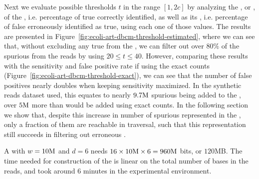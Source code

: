 Next we evaluate possible thresholds $t$ in the range $[1, 2c]$ by analyzing the , or , of the \dBCM, i.e. percentage of true  correctly identified, as well as its , i.e. percentage of false  erroneously identified as true, using each one of those values. The results are presented in Figure~\ref{fig:ecoli-art-dbcm-threshold-estimated}, where we can see that, without excluding any true  from the \dBG, we can filter out over $80\%$ of the spurious  from the reads by using $20 \leq t \leq 40$. However, comparing these results with the sensitivity and false positive rate if using the exact counts (Figure~\ref{fig:ecoli-art-dbcm-threshold-exact}), we can see that the number of false positives nearly doubles when keeping sensitivity maximized. In the synthetic reads dataset used, this equates to nearly $9.7\mega$ spurious  being added to the \dBG, over $5\mega$ more than would be added using exact counts. In the following section we show that, despite this increase in number of spurious  represented in the \dBCM, only a fraction of them are reachable in traversal, such that this representation still succeeds in filtering out erroneous .

A \dBCM with $w = 10\mega$ and $d = 6$ needs $16 \times 10\mega \times 6 = 960\mega$ bits, or $120$MB. The time needed for construction of the \dBCM is linear on the total number of bases in the reads, and took around $6$ minutes in the experimental environment.


